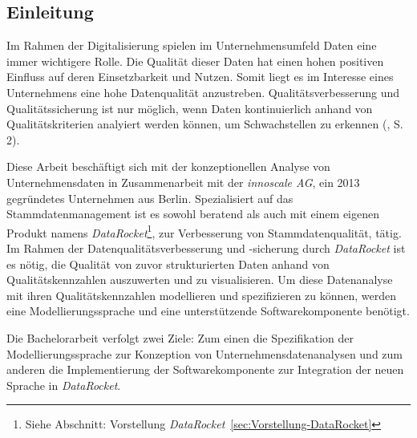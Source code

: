 \documentclass[
  language=german, %
  type=bachelor%
]{isthesis}
\begin{document}
\begin{content}



  \chapter{Einleitung}


  Im Rahmen der Digitalisierung spielen im Unternehmensumfeld Daten eine immer
  wichtigere Rolle. Die Qualität dieser Daten hat einen hohen positiven
  Einfluss auf deren Einsetzbarkeit und Nutzen. Somit liegt es im Interesse
  eines Unternehmens eine hohe Datenqualität anzustreben. Qualitätsverbesserung
  und Qualitätssicherung ist nur möglich, wenn Daten kontinuierlich anhand von
  Qualitätskriterien analyiert werden können, um Schwachstellen zu erkennen
  (\cite{baghi2013controlling}, S. 2).

  Diese Arbeit beschäftigt sich mit der konzeptionellen Analyse von
  Unternehmensdaten in Zusammenarbeit mit der \textit{innoscale AG}, ein 2013
  gegründetes Unternehmen aus Berlin.  Spezialisiert auf das
  Stammdatenmanagement ist es sowohl beratend als auch mit einem eigenen
  Produkt namens \textit{DataRocket}\footnote{Siehe Abschnitt: Vorstellung
  \textit{DataRocket}~\ref{sec:Vorstellung-DataRocket}}, zur Verbesserung von
  Stammdatenqualität, tätig. Im Rahmen der Datenqualitätsverbesserung und
  -sicherung durch \textit{DataRocket} ist es nötig, die Qualität von zuvor
  strukturierten Daten anhand von Qualitätskennzahlen auszuwerten und zu
  visualisieren. Um diese Datenanalyse mit ihren Qualitätskennzahlen
  modellieren und spezifizieren zu können, werden eine Modellierungssprache und
  eine unterstützende Softwarekomponente benötigt.

  Die Bachelorarbeit verfolgt zwei Ziele: Zum einen die Spezifikation der
  Modellierungssprache zur Konzeption von Unternehmensdatenanalysen und zum
  anderen die Implementierung der Softwarekomponente zur Integration der neuen
  Sprache in \textit{DataRocket}.


\end{content}
\end{document}
